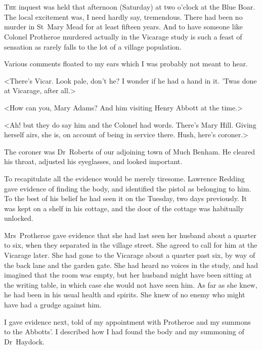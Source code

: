 \chapter[Chapter  \thechapter]{}


\lettrine{T}{he} inquest was held that afternoon (Saturday) at two o'clock at the Blue Boar. The local excitement was, I need hardly say, tremendous. There had been no murder in St~Mary Mead for at least fifteen years. And to have someone like Colonel Protheroe murdered actually in the Vicarage study is such a feast of sensation as rarely falls to the lot of a village population.

Various comments floated to my ears which I was probably not meant to hear.

<There's Vicar. Look pale, don't he? I wonder if he had a hand in it. 'Twas done at Vicarage, after all.>

<How can you, Mary Adams? And him visiting Henry Abbott at the time.>

<Ah! but they do say him and the Colonel had words. There's Mary Hill. Giving herself airs, she is, on account of being in service there. Hush, here's coroner.>

The coroner was Dr~Roberts of our adjoining town of Much Benham. He cleared his throat, adjusted his eyeglasses, and looked important.

To recapitulate all the evidence would be merely tiresome. Lawrence Redding gave evidence of finding the body, and identified the pistol as belonging to him. To the best of his belief he had seen it on the Tuesday, two days previously. It was kept on a shelf in his cottage, and the door of the cottage was habitually unlocked.

Mrs~Protheroe gave evidence that she had last seen her husband about a quarter to six, when they separated in the village street. She agreed to call for him at the Vicarage later. She had gone to the Vicarage about a quarter past six, by way of the back lane and the garden gate. She had heard no voices in the study, and had imagined that the room was empty, but her husband might have been sitting at the writing table, in which case she would not have seen him. As far as she knew, he had been in his usual health and spirits. She knew of no enemy who might have had a grudge against him.

I gave evidence next, told of my appointment with Protheroe and my summons to the Abbotts'. I described how I had found the body and my summoning of Dr~Haydock.

